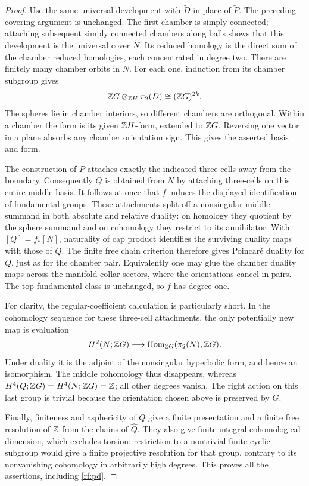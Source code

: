 \begin{proof}
Use the same universal development with $\widetilde D$ in place of
$\widetilde P$.  The preceding covering argument is unchanged.
The first chamber is simply connected; attaching subsequent simply
connected chambers along balls shows that this development is the
universal cover $\widetilde N$.  Its reduced homology is the direct
sum of the chamber reduced homologies, each concentrated in degree two.
There are finitely many chamber orbits in $N$.  For each one, induction
from its chamber subgroup gives
\[
 \mathbb Z G\otimes_{\mathbb Z H}\pi_2(D)
       \cong (\mathbb Z G)^{2k}.
\]
The spheres lie in chamber interiors, so different chambers are
orthogonal.  Within a chamber the form is its given $\mathbb Z H$-form,
extended to $\mathbb Z G$.  Reversing one vector in a plane absorbs any
chamber orientation sign.  This gives the asserted basis and form.

The construction of $P$ attaches exactly the indicated three-cells
away from the boundary.  Consequently $Q$ is obtained from $N$ by
attaching three-cells on this entire middle basis.  It follows at
once that $f$ induces the displayed identification of fundamental
groups.  These attachments split off a nonsingular middle summand
in both absolute and relative duality: on homology they quotient
by the sphere summand and on cohomology they restrict to its
annihilator.  With $[Q]=f_*[N]$, naturality of cap product identifies
the surviving duality maps with those of $Q$.  The finite free chain
criterion therefore gives Poincar\'e duality for $Q$, just as for the
chamber pair.  Equivalently one may glue the chamber duality maps
across the manifold collar sectors, where the orientations cancel
in pairs.  The top fundamental class is unchanged, so $f$ has degree
one.

For clarity, the regular-coefficient calculation is particularly
short.  In the cohomology sequence for these three-cell attachments,
the only potentially new map is evaluation
\[
 H^2(N;\mathbb Z G)\longrightarrow
       \operatorname{Hom}_{\mathbb Z G}(\pi_2(N),\mathbb Z G).
\]
Under duality it is the adjoint of the nonsingular hyperbolic form,
and hence an isomorphism.  The middle cohomology thus disappears,
whereas $H^4(Q;\mathbb Z G)=H^4(N;\mathbb Z G)=\mathbb Z$; all other degrees vanish.
The right action on this last group is trivial because the orientation
chosen above is preserved by $G$.

Finally, finiteness and asphericity of $Q$ give a finite presentation
and a finite free resolution of $\mathbb Z$ from the chains of $\widehat Q$.
They also give finite integral cohomological dimension, which excludes
torsion: restriction to a nontrivial finite cyclic subgroup would give
a finite projective resolution for that group, contrary to its
nonvanishing cohomology in arbitrarily high degrees.  This proves
all the assertions, including \eqref{rf:pd}.
\end{proof}

